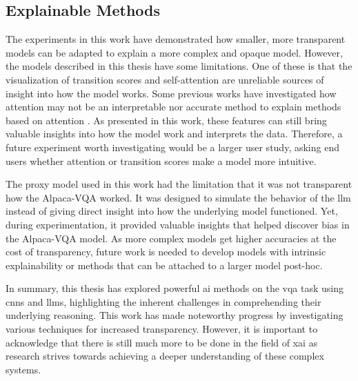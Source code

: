 \subsection{Explainable Methods}

    The experiments in this work have demonstrated how smaller, more transparent models can be adapted to explain a more complex and opaque model. 
    However, the models described in this thesis have some limitations. 
    One of these is that the visualization of transition scores and self-attention are unreliable sources of insight into how the model works. 
    Some previous works have investigated how attention may not be an interpretable nor accurate method to explain methods based on attention \cite{serranoAttentionInterpretable2019, jainAttentionNotExplanation2019}. 
    As presented in this work, these features can still bring valuable insights into how the model work and interprets the data. 
    Therefore, a future experiment worth investigating would be a larger user study, asking end users whether attention or transition scores make a model more intuitive.
    
    The proxy model used in this work had the limitation that it was not transparent how the Alpaca-VQA worked. It was designed to simulate the behavior of the \gls{llm} instead of giving direct insight into how the underlying model functioned. Yet, during experimentation, it provided valuable insights that helped discover bias in the Alpaca-VQA model. 
    As more complex models get higher accuracies at the cost of transparency, future work is needed to develop models with intrinsic explainability or methods that can be attached to a larger model post-hoc.\newline


    
    In summary, this thesis has explored powerful \gls{ai} methods on the \gls{vqa} task using \glspl{cnn} and \glspl{llm}, highlighting the inherent challenges in comprehending their underlying reasoning. This work has made noteworthy progress by investigating various techniques for increased transparency. 
    However, it is important to acknowledge that there is still much more to be done in the field of \gls{xai} as research strives towards achieving a deeper understanding of these complex systems.

